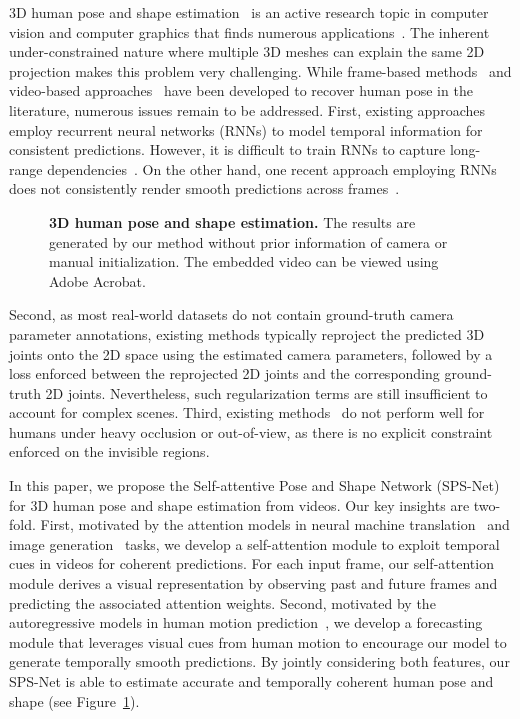 \documentclass[times,referee,twocolumn,final,authoryear]{elsarticle}
\begin{document}
3D human pose and shape estimation~\citep{HMR,SPIN,SMPLify} is an active research topic in computer vision and computer graphics that finds numerous applications~\citep{xu2019mo,liu2018neural}. 
The inherent under-constrained nature where multiple 3D meshes can explain the same 2D projection makes this problem very challenging.
While frame-based methods~\citep{HMR,SPIN,SMPLify} and video-based approaches~\citep{VIBE,lee2018propagating,rayat2018exploiting,TemporalHMR,PHD} have been developed to recover human pose in the literature, numerous issues remain to be addressed. 
First, existing approaches employ recurrent neural networks (RNNs) to model temporal information for consistent predictions.
However, it is difficult to train RNNs to capture long-range dependencies~\citep{transformer,pascanu2013difficulty}.
On the other hand, one recent approach employing RNNs does not consistently render smooth predictions across frames~\citep{VIBE}.
\begin{figure}[t]
  \begin{center}
  \vspace{-5.5mm}
  \caption{
  \textbf{3D human pose and shape estimation.} 
The results are generated by our method without prior information of camera or manual initialization. The embedded video can be viewed using Adobe Acrobat.
  }
  \label{fig:teaser}
  \end{center}
  \vspace{-8.0mm}
\end{figure}
Second, as most real-world datasets do not contain ground-truth camera parameter annotations, existing methods typically reproject the predicted 3D joints onto the 2D space using the estimated camera parameters, followed by a loss enforced between the reprojected 2D joints and the corresponding ground-truth 2D joints.
Nevertheless, such regularization terms are still insufficient to account for complex scenes. 
Third, existing methods~\citep{VIBE,TemporalHMR,PHD,HMR} do not perform well for humans under heavy occlusion or out-of-view, as there is no explicit constraint enforced on the invisible regions.

In this paper, we propose the Self-attentive Pose and Shape Network (SPS-Net) for 3D human pose and shape estimation from videos.
Our key insights are two-fold.
First, motivated by the attention models in neural machine translation~\citep{transformer} and image generation~\citep{SAGAN} tasks, we develop a self-attention module to exploit temporal cues in videos for coherent predictions.
For each input frame, our self-attention module derives a visual representation by observing past and future frames and predicting the associated attention weights.
Second, motivated by the autoregressive models in human motion prediction~\citep{TemporalHMR,PHD}, we develop a forecasting module that leverages visual cues from human motion to encourage our model to generate temporally smooth predictions.
By jointly considering both features, our SPS-Net is able to estimate accurate and temporally coherent human pose and shape (see Figure~\ref{fig:teaser}).
\end{document}
